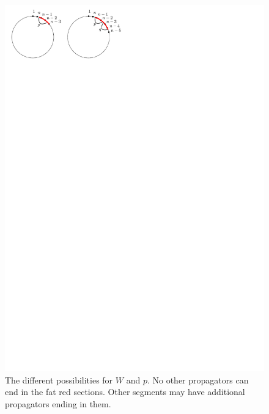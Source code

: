 \documentclass[11pt]{article}
\theoremstyle{remark}
\theoremstyle{definition}
\begin{document}
\begin{figure}
 \includegraphics{specialp}
  \caption{The different possibilities for $W$ and $p$.  No other propagators can end in the fat red sections.  Other segments may have additional propagators ending in them.}\label{fig special p}
\end{figure}
\end{document}
